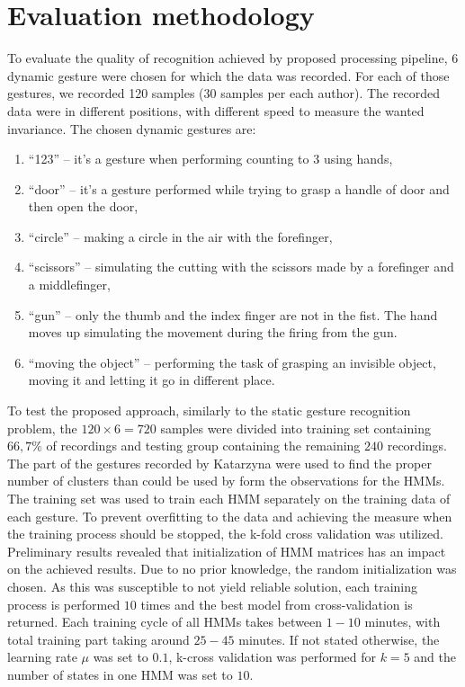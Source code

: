 \section{Evaluation methodology}

To evaluate the quality of recognition achieved by proposed processing pipeline, 6 dynamic gesture were chosen for which the data was recorded.
For each of those gestures, we recorded 120 samples (30 samples per each author).
The recorded data were in different positions, with different speed to measure the wanted invariance.
The chosen dynamic gestures are:
\begin{enumerate}
\item ``123'' -- it's a gesture when performing counting to 3 using hands,
\item ``door'' -- it's a gesture performed while trying to grasp a handle of door and then open the door,
\item ``circle'' -- making a circle in the air with the forefinger,
\item ``scissors'' -- simulating the cutting with the scissors made by a forefinger and a middlefinger,
\item ``gun'' -- only the thumb and the index finger are not in the fist. The hand moves up simulating the movement during the firing from the gun.
\item ``moving the object'' -- performing the task of grasping an invisible object, moving it and letting it go in different place.
\end{enumerate}

To test the proposed approach, similarly to the static gesture recognition problem, the $120\times6=720$ samples were divided into training set containing $66,7\%$ of recordings and testing group containing the remaining $240$ recordings. 
The part of the gestures recorded by Katarzyna were used to find the proper number of clusters than could be used by form the observations for the HMMs. 
The training set was used to train each HMM separately on the training data of each gesture. 
To prevent overfitting to the data and achieving the measure when the training process should be stopped, the k-fold cross validation was utilized. 
Preliminary results revealed that initialization of HMM matrices has an impact on the achieved results.
Due to no prior knowledge, the random initialization was chosen.
As this was susceptible to not yield reliable solution, each training process is performed $10$ times and the best model from cross-validation is returned.  
Each training cycle of all HMMs takes between $1-10$ minutes, with total training part taking around $25-45$ minutes.
If not stated otherwise, the learning rate $\mu$ was set to $0.1$, k-cross validation was performed for $k=5$ and the number of states in one HMM was set to $10$.


